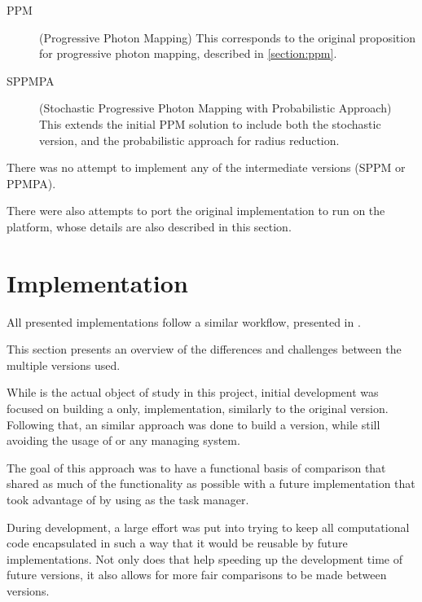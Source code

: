\documentclass[main.tex]{subfiles}
\begin{document}
\begin{description}
\item[PPM] (Progressive Photon Mapping) This corresponds to the original proposition for progressive photon mapping, described in \cref{section:ppm}.

\item[SPPMPA] (Stochastic Progressive Photon Mapping with Probabilistic Approach) This extends the initial PPM solution to include both the stochastic version, and the probabilistic approach for radius reduction.
\end{description}

There was no attempt to implement any of the intermediate versions (SPPM or PPMPA).

There were also attempts to port the original implementation to run on the \mic platform, whose details are also described in this section.




\section{Implementation}

All presented implementations follow a similar workflow, presented in .

This section presents an overview of the differences and challenges between the multiple versions used.

While \starpu is the actual object of study in this project, initial development was focused on building a \cpu only, implementation, similarly to the original version. Following that, an similar approach was done to build a \cuda version, while still avoiding the usage of \starpu or any \hetplat managing system.

The goal of this approach was to have a functional basis of comparison that shared as much of the functionality as possible with a future implementation that took advantage of \hetplats by using \starpu as the task manager.

During development, a large effort was put into trying to keep all computational code encapsulated in such a way that it would be reusable by future implementations. Not only does that help speeding up the development time of future versions, it also allows for more fair comparisons to be made between versions.






\end{document}
